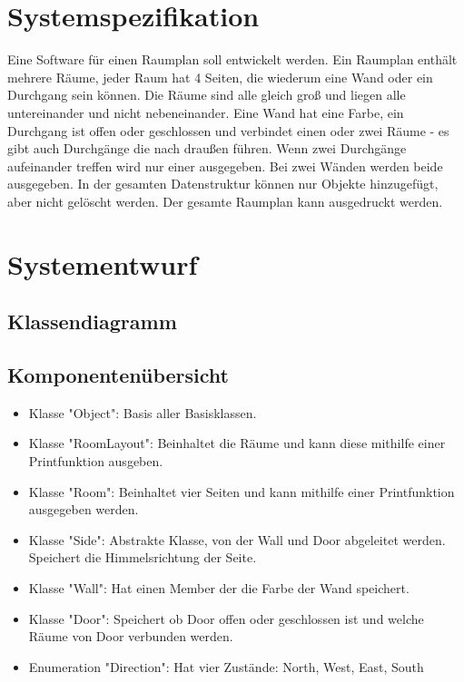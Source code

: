 \documentclass[12pt,a4paper]{article}
\begin{document}
\section{Systemspezifikation}
Eine Software für einen Raumplan soll entwickelt werden. Ein Raumplan enthält mehrere Räume, jeder Raum hat 4 Seiten, die wiederum eine Wand oder ein Durchgang sein können. Die Räume sind alle gleich groß und liegen alle untereinander und nicht nebeneinander. Eine Wand hat eine Farbe, ein Durchgang ist offen oder geschlossen und verbindet einen oder zwei Räume - es gibt auch Durchgänge die nach draußen führen. Wenn zwei Durchgänge aufeinander treffen wird nur einer ausgegeben. Bei zwei Wänden werden beide ausgegeben. In der gesamten Datenstruktur können nur Objekte hinzugefügt, aber nicht gelöscht werden. Der gesamte Raumplan kann ausgedruckt werden. \\


\newpage
\section {Systementwurf}

\subsection {Klassendiagramm}



\subsection {Komponentenübersicht}
\begin {itemize} 
	\item Klasse "Object":
	\newline
	Basis aller Basisklassen.
	\item Klasse "RoomLayout":
	\newline
	Beinhaltet die Räume und kann diese mithilfe einer Printfunktion ausgeben.
	\item Klasse "Room":
	\newline	
	Beinhaltet vier Seiten und kann mithilfe einer Printfunktion ausgegeben werden.
	\item Klasse "Side":
	\newline
	Abstrakte Klasse, von der Wall und Door abgeleitet werden. Speichert die Himmelsrichtung der Seite.
	\item Klasse "Wall":
	\newline
	Hat einen Member der die Farbe der Wand speichert.
	\item Klasse "Door": 
	\newline
	Speichert ob Door offen oder geschlossen ist und welche Räume von Door verbunden werden.
	\item Enumeration "Direction":
	\newline
	Hat vier Zustände: North, West, East, South

\end {itemize}
\end{document}
